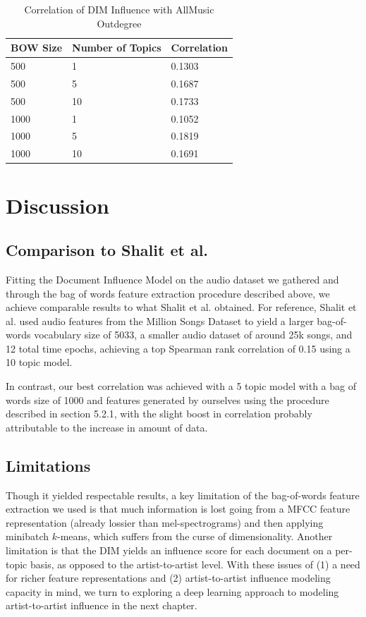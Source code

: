 \begin{table}[H]
\centering
\caption{Correlation of DIM Influence with AllMusic Outdegree}
\label{my-label}
\begin{tabular}{|l|l|l|}
\hline
BOW Size & Number of Topics & Correlation \\ \hline
500      & 1                & 0.1303        \\ \hline
500      & 5                & 0.1687      \\ \hline
500      & 10               & 0.1733    \\ \hline
1000     & 1                & 0.1052      \\ \hline
1000     & 5                & 0.1819      \\ \hline
1000     & 10               & 0.1691      \\ \hline
\end{tabular}
\end{table}


\section{Discussion}
\subsection{Comparison to Shalit et al.}
Fitting the Document Influence Model on the audio dataset we gathered and through the bag of words feature extraction procedure described above, we achieve comparable results to what Shalit et al. obtained. For reference, Shalit et al. used audio features from the Million Songs Dataset to yield a larger bag-of-words vocabulary size of 5033, a smaller audio dataset of around 25k songs, and 12 total time epochs, achieving a top Spearman rank correlation of 0.15 using a 10 topic model.

In contrast, our best correlation was achieved with a 5 topic model with a bag of words size of 1000 and features generated by ourselves using the procedure described in section 5.2.1, with the slight boost in correlation probably attributable to the increase in amount of data.

\subsection{Limitations}
Though it yielded respectable results, a key limitation of the bag-of-words feature extraction we used is that much information is lost going from a MFCC feature representation (already lossier than mel-spectrograms) and then applying minibatch $k$-means, which suffers from the curse of dimensionality. Another limitation is that the DIM yields an influence score for each document on a per-topic basis, as opposed to the artist-to-artist level. With these issues of (1) a need for richer feature representations and (2) artist-to-artist influence modeling capacity in mind, we turn to exploring a deep learning approach to modeling artist-to-artist influence in the next chapter.